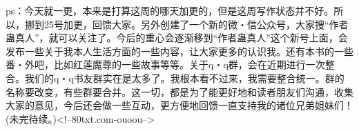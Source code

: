 \begin{this_body}
ps：今天就一更，本来是打算这周的哪天加更的，但是这周写作状态并不好。所以，挪到25号加更，回馈大家。另外创建了一个新的微・信公众号，大家搜“作者蛊真人”，就可以关注了。今后的重心会逐渐移到“作者蛊真人”这个新号上面，会发布一些关于我本人生活方面的一些内容，让大家更多的认识我。还有本书的一些番・外吧，比如红莲魔尊的一些故事等等。关于q・q群，会在近期进行一次整合。我们的q・q书友群实在是太多了。我根本看不过来，我需要整合统一。群的名称要改变，有些群要合并。这一切，都是为了能更好地和读者朋友们沟通，收集大家的意见，今后还会做一些互动，更方便地回馈一直支持我的诸位兄弟姐妹们！(未完待续。)<!--80txt.com-ouoou-->

\end{this_body}

